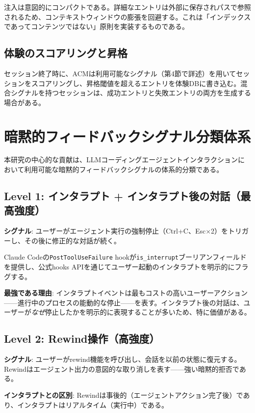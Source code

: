 \documentclass[conference]{IEEEtran}
\begin{document}
注入は意図的にコンパクトである。詳細なエントリは外部に保存されパスで参照されるため、コンテキストウィンドウの膨張を回避する。これは「インデックスであってコンテンツではない」原則を実装するものである。

\subsection{体験のスコアリングと昇格}

セッション終了時に、ACMは利用可能なシグナル（第4節で詳述）を用いてセッションをスコアリングし、昇格閾値を超えるエントリを体験DBに書き込む。混合シグナルを持つセッションは、成功エントリと失敗エントリの両方を生成する場合がある。

\section{暗黙的フィードバックシグナル分類体系}

本研究の中心的な貢献は、LLMコーディングエージェントインタラクションにおいて利用可能な暗黙的フィードバックシグナルの体系的分類である。

\subsection{Level 1: インタラプト + インタラプト後の対話（最高強度）}

\textbf{シグナル}: ユーザーがエージェント実行の強制停止（Ctrl+C、Esc$\times$2）をトリガーし、その後に修正的な対話が続く。

Claude Codeの\texttt{PostToolUseFailure} hookが\texttt{is\_interrupt}ブーリアンフィールドを提供し、公式hooks APIを通じてユーザー起動のインタラプトを明示的にフラグする。

\textbf{最強である理由}: インタラプトイベントは最もコストの高いユーザーアクション——進行中のプロセスの能動的な停止——を表す。インタラプト後の対話は、ユーザーが\emph{なぜ}停止したかを明示的に表現することが多いため、特に価値がある。

\subsection{Level 2: Rewind操作（高強度）}

\textbf{シグナル}: ユーザーがrewind機能を呼び出し、会話を以前の状態に復元する。Rewindはエージェント出力の意図的な取り消しを表す——強い暗黙的拒否である。

\textbf{インタラプトとの区別}: Rewindは事後的（エージェントアクション完了後）であり、インタラプトはリアルタイム（実行中）である。
\end{document}
